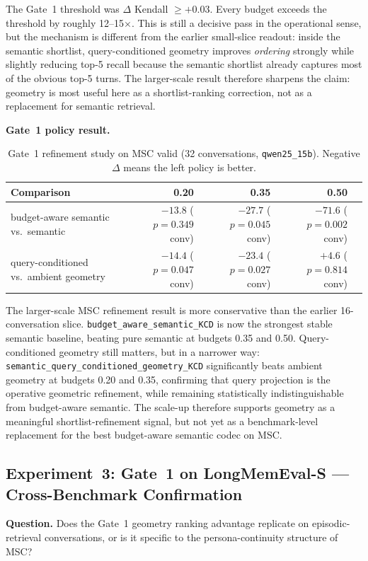 \documentclass[conference]{IEEEtran}
\begin{document}
The Gate~1 threshold was $\Delta$ Kendall $\geq +0.03$. Every budget exceeds the threshold by roughly 12--15$\times$. This is still a decisive pass in the operational sense, but the mechanism is different from the earlier small-slice readout: inside the semantic shortlist, query-conditioned geometry improves \emph{ordering} strongly while slightly reducing top-5 recall because the semantic shortlist already captures most of the obvious top-5 turns. The larger-scale result therefore sharpens the claim: geometry is most useful here as a shortlist-ranking correction, not as a replacement for semantic retrieval.

\textbf{Gate~1 policy result.}

\begin{table}[t]
    \centering
    \caption{Gate~1 refinement study on MSC valid (32 conversations, \texttt{qwen25\_15b}). Negative $\Delta$ means the left policy is better.}
    \label{tab:gate1_policy}
    \begin{tabular}{lrrrr}
        \toprule
        Comparison & 0.20 & 0.35 & 0.50 \\
        \midrule
        budget-aware semantic vs.\ semantic & $-13.8$ ($p{=}0.349$ conv) & $-27.7$ ($p{=}0.045$ conv) & $-71.6$ ($p{=}0.002$ conv) \\
        query-conditioned vs.\ ambient geometry & $-14.4$ ($p{=}0.047$ conv) & $-23.4$ ($p{=}0.027$ conv) & $+4.6$ ($p{=}0.814$ conv) \\
        \bottomrule
    \end{tabular}
\end{table}

The larger-scale MSC refinement result is more conservative than the earlier 16-conversation slice. \texttt{budget\_aware\_semantic\_KCD} is now the strongest stable semantic baseline, beating pure semantic at budgets 0.35 and 0.50. Query-conditioned geometry still matters, but in a narrower way: \texttt{semantic\_query\_conditioned\_geometry\_KCD} significantly beats ambient geometry at budgets 0.20 and 0.35, confirming that query projection is the operative geometric refinement, while remaining statistically indistinguishable from budget-aware semantic. The scale-up therefore supports geometry as a meaningful shortlist-refinement signal, but not yet as a benchmark-level replacement for the best budget-aware semantic codec on MSC.

\subsection{Experiment~3: Gate~1 on LongMemEval-S --- Cross-Benchmark Confirmation}
\label{sec:gate1_longmem}
\textbf{Question.} Does the Gate~1 geometry ranking advantage replicate on episodic-retrieval conversations, or is it specific to the persona-continuity structure of MSC?
\end{document}
